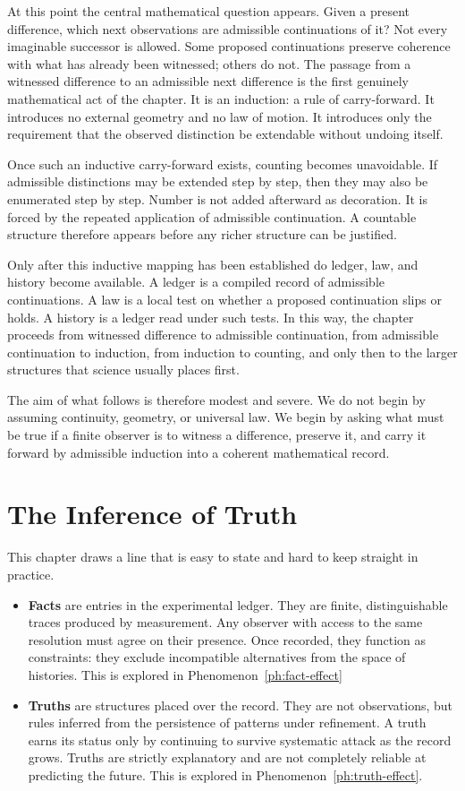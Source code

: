 At this point the central mathematical question appears. Given a present
difference, which next observations are admissible continuations of it? Not
every imaginable successor is allowed. Some proposed continuations preserve
coherence with what has already been witnessed; others do not. The passage
from a witnessed difference to an admissible next difference is the first
genuinely mathematical act of the chapter. It is an induction: a rule of
carry-forward. It introduces no external geometry and no law of motion. It
introduces only the requirement that the observed distinction be extendable
without undoing itself.

Once such an inductive carry-forward exists, counting becomes unavoidable.
If admissible distinctions may be extended step by step, then they may also be
enumerated step by step. Number is not added afterward as decoration. It is
forced by the repeated application of admissible continuation. A countable
structure therefore appears before any richer structure can be justified.

Only after this inductive mapping has been established do ledger, law, and
history become available. A ledger is a compiled record of admissible
continuations. A law is a local test on whether a proposed continuation slips
or holds. A history is a ledger read under such tests. In this way, the
chapter proceeds from witnessed difference to admissible continuation, from
admissible continuation to induction, from induction to counting, and only
then to the larger structures that science usually places first.

The aim of what follows is therefore modest and severe. We do not begin by
assuming continuity, geometry, or universal law. We begin by asking what must
be true if a finite observer is to witness a difference, preserve it, and
carry it forward by admissible induction into a coherent mathematical record.


\section{The Inference of Truth}

This chapter draws a line that is easy to state and hard to keep straight in
practice.

\begin{itemize}
\item \textbf{Facts} are entries in the experimental ledger. They are finite,
distinguishable traces produced by measurement. Any observer with access to the
same resolution must agree on their presence. Once recorded, they function as
constraints: they exclude incompatible alternatives from the space of
histories.  This is explored in Phenomenon~\ref{ph:fact-effect}
\item \textbf{Truths} are structures placed over the record. They are not
observations, but rules inferred from the persistence of patterns under
refinement. A truth earns its status only by continuing to survive systematic
attack as the record grows.  Truths are strictly explanatory and are not completely
reliable at predicting the future.  This is explored in Phenomenon~\ref{ph:truth-effect}.
\end{itemize}

